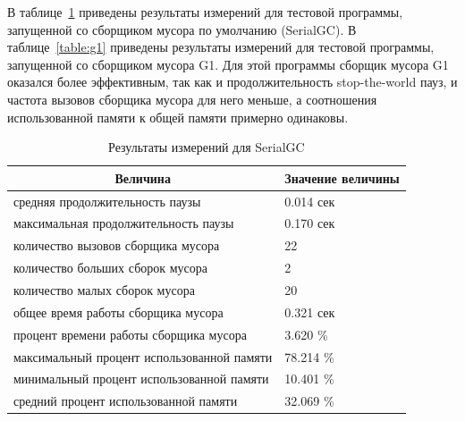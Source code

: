 \documentclass[12pt,a4paper]{article}
\begin{document}
В таблице~\ref{table:serialgc} приведены результаты измерений для тестовой программы, запущенной со сборщиком мусора по умолчанию (SerialGC).
В таблице~\ref{table:g1} приведены результаты измерений для тестовой программы, 
запущенной со сборщиком мусора G1. Для этой программы сборщик мусора G1 оказался
более эффективным, так как и продолжительность stop-the-world пауз, и частота вызовов 
сборщика мусора для него меньше, а соотношения использованной памяти к общей памяти
примерно одинаковы.

\begin{table}[h!]
\caption {Результаты измерений для SerialGC}
\label{table:serialgc}
\begin{center}
\begin{tabular}{|l|l|}
\hline
\multicolumn {1}{|c|}{Величина} & \multicolumn {1}{|c|}{Значение величины}\\
\hline
средняя продолжительность паузы & 0.014 сек\\
\hline
максимальная продолжительность паузы & 0.170 сек\\
\hline
количество вызовов сборщика мусора & 22\\
\hline
количество больших сборок мусора & 2 \\
\hline
количество малых сборок мусора & 20 \\
\hline
общее время работы сборщика мусора & 0.321 сек\\
\hline
процент времени работы сборщика мусора & 3.620 \%\\
\hline
максимальный процент использованной памяти & 78.214 \%\\
\hline
минимальный процент использованной памяти & 10.401 \%\\
\hline
средний процент использованной памяти & 32.069 \%\\
\hline
\end{tabular}
\end{center}
\end{table}
\end{document}
